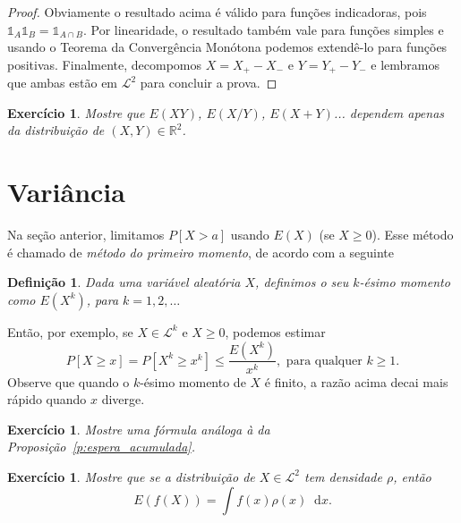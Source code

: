 \documentclass[reqno, final]{book}
\newcommand*\1{\mathds{1}}
\newtheorem{definition}[theorem]{Definição}
\newtheorem{exercise}[example]{Exercício}
\renewcommand*\d{\mathop{}\!\mathrm{d}}
\begin{document}
\begin{proof}
  Obviamente o resultado acima é válido para funções indicadoras, pois $\1_A \1_B = \1_{A \cap B}$.
  Por linearidade, o resultado também vale para funções simples e usando o Teorema da Convergência Monótona podemos extendê-lo para funções positivas.
  Finalmente, decompomos $X = X_+ - X_-$ e $Y = Y_+ - Y_-$ e lembramos que ambas estão em $\mathcal{L}^2$ para concluir a prova.
\end{proof}

\begin{exercise}
  Mostre que $E(XY)$, $E(X/Y)$, $E(X + Y)$... dependem apenas da distribuição de $(X,Y) \in \mathbb{R}^2$.
\end{exercise}


\section{Variância}

Na seção anterior, limitamos $P[X > a]$ usando $E(X)$ (se $X \geq 0$).
Esse método é chamado de \emph{método do primeiro momento},  de acordo com a seguinte
\begin{definition}
  Dada uma variável aleatória $X$, definimos o seu $k$-ésimo momento como $E(X^k)$, para $k = 1, 2, \dots$
\end{definition}

Então, por exemplo, se $X \in \mathcal{L}^k$ e $X \geq 0$, podemos estimar
\begin{equation}
  P[X \geq x] = P [X^k \geq x^k] \leq \frac{E(X^k)}{x^k}, \text{ para qualquer $k \geq 1$.}
\end{equation}
Observe que quando o $k$-ésimo momento de $X$ é finito, a razão acima decai mais rápido quando $x$ diverge.

\begin{exercise}
  Mostre uma fórmula análoga à da Proposição~\ref{p:espera_acumulada}.
\end{exercise}

\begin{exercise}
  Mostre que se a distribuição de $X \in \mathcal{L}^2$ tem densidade $\rho$, então
  \begin{equation}
    E(f(X)) = \int f(x) \rho(x) \d x.
  \end{equation}
\end{exercise}
\end{document}
